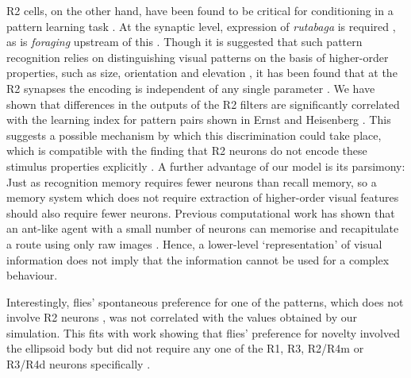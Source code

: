 R2 cells, on the other hand, have been found to be critical for conditioning in a pattern learning task \cite{Pan2009}.
At the synaptic level, expression of \emph{rutabaga} is required \cite{Pan2009}, as is \emph{foraging} upstream of this \cite{Wang2008}.
Though it is suggested that such pattern recognition relies on distinguishing visual patterns on the basis of higher-order properties, such as size, orientation and elevation \cite{Ernst1999,Pan2009}, it has been found that at the R2 synapses the encoding is independent of any single parameter \cite{Liu2006}.
We have shown that differences in the outputs of the R2 filters are significantly correlated with the learning index for pattern pairs shown in Ernst and Heisenberg \cite{Ernst1999}.
This suggests a possible mechanism by which this discrimination could take place, which is compatible with the finding that R2 neurons do not encode these stimulus properties explicitly \cite{Liu2006}.
A further advantage of our model is its parsimony:
Just as recognition memory requires fewer neurons than recall memory, so a memory system which does not require extraction of higher-order visual features should also require fewer neurons.
Previous computational work has shown that an ant-like agent with a small number of neurons can memorise and recapitulate a route using only raw images \cite{Baddeley2011}.
Hence, a lower-level `representation' of visual information does not imply that the information cannot be used for a complex behaviour.

Interestingly, flies' spontaneous preference for one of the patterns, which does not involve R2 neurons \cite{Ernst1999}, was not correlated with the values obtained by our simulation.
This fits with work showing that flies' preference for novelty involved the ellipsoid body but did not require any one of the R1, R3, R2/R4m or R3/R4d neurons specifically \cite{Solanki2015}.

